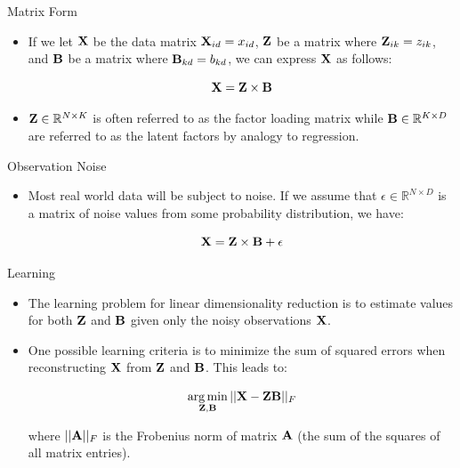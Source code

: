 \documentclass[serif,xcolor=pdftex,dvipsnames,table,hyperref={bookmarks=false,breaklinks}]{beamer}
\begin{document}
\begin{frame}[t]{Matrix Form}
 
\begin{itemize}
\item If we let ${\mathbf{X}}$ be the data matrix ${\mathbf{X}}_{id}= x_{id}$,
${\mathbf{Z}}$ be a matrix where ${\mathbf{Z}}_{ik}=z_{ik}$, and ${\mathbf{B}}$ be a matrix 
where ${\mathbf{B}}_{kd}=b_{kd}$, we can express ${\mathbf{X}}$ as follows:

{\Large
$${\mathbf{X}} = {\mathbf{Z}}\times {\mathbf{B}}$$
}

\pause\item ${\mathbf{Z}}\in \mathbb{R}^{N\times K}$ is often referred to as the 
factor loading matrix while ${\mathbf{B}}\in \mathbb{R}^{K\times D}$ are referred to 
as the latent factors by analogy to regression.

\end{itemize} 
\end{frame}

\begin{frame}[t]{Observation Noise}
 
\begin{itemize}
\item Most real world data will be subject to noise. If we assume that 
$\epsilon \in \mathbb{R}^{N\times D}$ is a matrix of noise values from some
probability distribution, we have:

{\Large
$${\mathbf{X}} = {\mathbf{Z}}\times {\mathbf{B}} + \epsilon$$
}

\end{itemize} 
\end{frame}

\begin{frame}[t]{Learning}
 
\begin{itemize}
\item The learning problem for linear dimensionality reduction is to estimate
values for both ${\mathbf{Z}}$ and ${\mathbf{B}}$ given only the noisy observations 
${\mathbf{X}}$.

\pause\item One possible learning criteria is to minimize the sum of squared 
errors when reconstructing ${\mathbf{X}}$ from ${\mathbf{Z}}$ and ${\mathbf{B}}$. This leads 
to:

{\Large
$$\operatorname*{arg\,min}_{{\mathbf{Z}},{\mathbf{B}}} ||{\mathbf{X}} - {\mathbf{Z}}{\mathbf{B}} ||_F$$
}

where $||{\mathbf{A}}||_F$ is the Frobenius norm of matrix  ${\mathbf{A}}$ (the sum of 
the squares of all matrix entries). 

\end{itemize} 
\end{frame}
\end{document}
